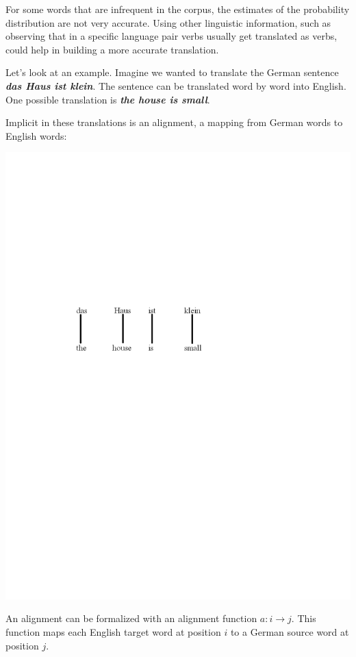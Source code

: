 \documentclass[10pt]{report}
\theoremstyle{plain}
\begin{document}
{For some words that are infrequent in the corpus, the estimates of
the probability distribution are not very accurate. Using other
linguistic information, such as observing that in a specific
language pair verbs usually get translated as verbs, could help in
building a more accurate translation.

Let's look at an example. Imagine we wanted to translate the German
sentence \textbf{\emph{das Haus ist klein}}. The sentence can be
translated word by word into English. One possible translation is
\textbf{\emph{the house is small}}.


Implicit in these translations is an alignment, a mapping from
German words to English words:

\includegraphics[viewport = 100 440 400 530,clip]{constantin-figure1.pdf}

An alignment can be formalized with an alignment function $a : i
\rightarrow j$. This function maps each English target word at
position $i$ to a German source word at position $j$.

}
\end{document}
